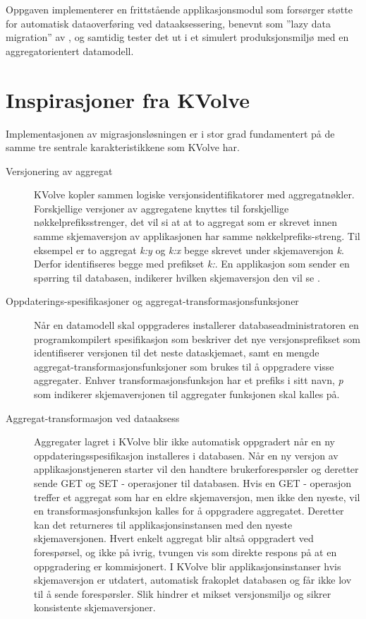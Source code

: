 Oppgaven implementerer en frittstående applikasjonsmodul som forsørger støtte for automatisk dataoverføring ved dataaksessering, benevnt som ''lazy data migration'' av \cite{saur2016}, og samtidig tester det ut i et simulert produksjonsmiljø med en aggregatorientert datamodell.

\section{Inspirasjoner fra KVolve}

Implementasjonen av migrasjonsløsningen er i stor grad fundamentert på de samme tre sentrale karakteristikkene som KVolve har.

\begin{description}
  \item [Versjonering av aggregat] KVolve kopler sammen logiske versjonsidentifikatorer med aggregatnøkler. Forskjellige versjoner av aggregatene knyttes til forskjellige nøkkel\-prefiks\-strenger, det vil si at at to aggregat som er skrevet innen samme skjemaversjon av applikasjonen har samme nøkkelprefiks-streng. Til eksempel er to aggregat \emph{k:y} og \emph{k:x} begge skrevet under skjemaversjon \emph{k}. Derfor identifiseres begge med prefikset \emph{k:}. En applikasjon som sender en spørring til databasen, indikerer hvilken skjemaversjon den vil se \citep{saur2016}.
  \item [Oppdaterings-spesifikasjoner og aggregat-transformasjonsfunksjoner] Når en datamodell skal oppgraderes installerer databaseadministratoren en programkompilert spesifikasjon som beskriver det nye versjonsprefikset som identifiserer versjonen til det neste dataskjemaet, samt en mengde aggregat-transformasjonsfunksjoner som brukes til å oppgradere visse aggregater. Enhver transformasjonsfunksjon har et prefiks i sitt navn, \emph{p} som indikerer skjemaversjonen til aggregater funksjonen skal kalles på.
  \item [Aggregat-transformasjon ved dataaksess] Aggregater lagret i KVolve blir ikke automatisk oppgradert når en ny oppdateringsspesifikasjon installeres i databasen. Når en ny versjon av applikasjonstjeneren starter vil den handtere brukerforespørsler og deretter sende GET og SET - operasjoner til databasen. Hvis en GET - operasjon treffer et aggregat som har en eldre skjemaversjon, men ikke den nyeste, vil en transformasjonsfunksjon kalles for å oppgradere aggregatet. Deretter kan det returneres til applikasjonsinstansen med den nyeste skjemaversjonen. Hvert enkelt aggregat blir altså oppgradert ved forespørsel, og ikke på ivrig, tvungen vis som direkte respons på at en oppgradering er kommisjonert. I KVolve blir applikasjonsinstanser hvis skjemaversjon er utdatert, automatisk frakoplet databasen og får ikke lov til å sende forespørsler. Slik hindrer \cite{saur2016} et mikset versjonsmiljø og sikrer konsistente skjemaversjoner.
\end{description}

